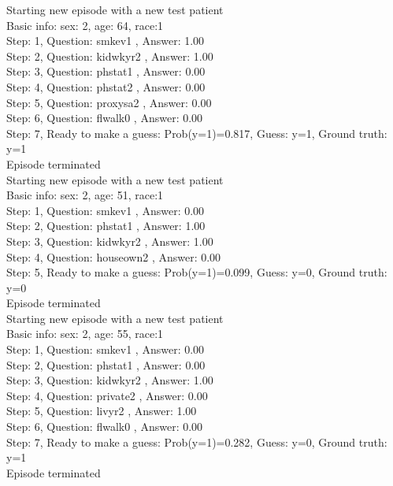 \documentclass[reqno,11pt]{article}
\begin{document}
\noindent Starting new episode with a new test patient \\ [0.5ex] 
Basic info: sex: 2, age: 64, race:1 \\ [0.5ex] 
Step: 1, Question:  smkev1 , Answer: 1.00 \\ [0.5ex] 
Step: 2, Question:  kidwkyr2 , Answer: 1.00 \\ [0.5ex] 
Step: 3, Question:  phstat1 , Answer: 0.00 \\ [0.5ex] 
Step: 4, Question:  phstat2 , Answer: 0.00 \\ [0.5ex] 
Step: 5, Question:  proxysa2 , Answer: 0.00 \\ [0.5ex] 
Step: 6, Question:  flwalk0 , Answer: 0.00 \\ [0.5ex] 
Step: 7, Ready to make a guess: Prob(y=1)=0.817, Guess: y=1, Ground truth: y=1 \\ [0.5ex] 
Episode terminated \\ [0.5ex] 

\noindent Starting new episode with a new test patient \\ [0.5ex] 
Basic info: sex: 2, age: 51, race:1 \\ [0.5ex] 
Step: 1, Question:  smkev1 , Answer: 0.00 \\ [0.5ex] 
Step: 2, Question:  phstat1 , Answer: 1.00 \\ [0.5ex] 
Step: 3, Question:  kidwkyr2 , Answer: 1.00 \\ [0.5ex] 
Step: 4, Question:  houseown2 , Answer: 0.00 \\ [0.5ex] 
Step: 5, Ready to make a guess: Prob(y=1)=0.099, Guess: y=0, Ground truth: y=0 \\ [0.5ex] 
Episode terminated \\ [0.5ex] 

\noindent Starting new episode with a new test patient \\ [0.5ex] 
Basic info: sex: 2, age: 55, race:1 \\ [0.5ex] 
Step: 1, Question:  smkev1 , Answer: 0.00 \\ [0.5ex] 
Step: 2, Question:  phstat1 , Answer: 0.00 \\ [0.5ex] 
Step: 3, Question:  kidwkyr2 , Answer: 1.00 \\ [0.5ex] 
Step: 4, Question:  private2 , Answer: 0.00 \\ [0.5ex] 
Step: 5, Question:  livyr2 , Answer: 1.00 \\ [0.5ex] 
Step: 6, Question:  flwalk0 , Answer: 0.00 \\ [0.5ex] 
Step: 7, Ready to make a guess: Prob(y=1)=0.282, Guess: y=0, Ground truth: y=1 \\ [0.5ex] 
Episode terminated \\ [0.5ex] 
\end{document}

